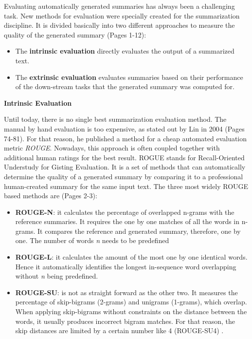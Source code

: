 Evaluating automatically generated summaries has always been a challenging task. New methods for evaluation were specially created for the summarization discipline. It is divided basically into two different approaches to measure the quality of the generated summary \cite{Jones98automaticsummarising:} (Pages 1-12):

\begin{itemize}
	\item The \textbf{intrinsic evaluation} directly evaluates the output of a summarized text. 
	\item The \textbf{extrinsic evaluation} evaluates summaries based on their performance of the down-stream tasks that the generated summary was computed for.
\end{itemize}

\textbf{Intrinsic Evaluation}

Until today, there is no single best summarization evaluation method. The manual by hand evaluation is too expensive, as stated out by Lin in 2004 \cite{lin-2004-rouge} (Pages 74-81). For that reason, he published a method for a cheap automated evaluation metric \textit{ROUGE}. Nowadays, this approach is often coupled together with additional human ratings for the best result. ROGUE stands for Recall-Oriented Understudy for Gisting Evaluation. It is a set of methods that can automatically determine the quality of a generated summary by comparing it to a professional human-created summary for the same input text. The three most widely ROUGE based methods are \cite{yue} (Pages 2-3):

\begin{itemize}
	\item \textbf{ROUGE-N}: it calculates the percentage of overlapped n-grams with the reference summaries. It requires the one by one matches of all the words in n-grams. It compares the reference and generated summary, therefore, one by one. The number of words \textit{n} needs to be predefined
	\item \textbf{ROUGE-L}: it calculates the amount of the most one by one identical words. Hence it automatically identifies the longest in-sequence word overlapping without \textit{n} being predefined.
	\item \textbf{ROUGE-SU}: is not as straight forward as the other two. It measures the percentage of skip-bigrams (2-grams) and unigrams (1-grams), which overlap. When applying skip-bigrams without constraints on the distance between the words, it usually produces incorrect bigram matches. For that reason, the skip distances are limited by a certain number like 4 (ROUGE-SU4) \cite{lin-2004-rouge}.
\end{itemize}


